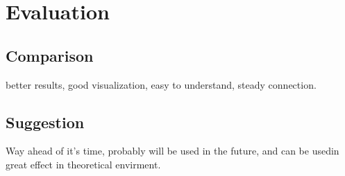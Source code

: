 \chapter{Evaluation}
\label{chap:evaluation}

\section{Comparison}
better results, good visualization, easy to understand, steady connection.
\section{Suggestion} 
Way ahead of it's time, probably will be used in the future, and can be usedin great effect in theoretical envirment. 